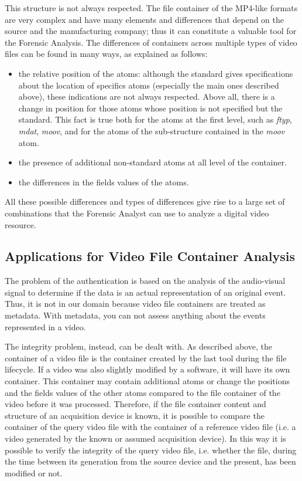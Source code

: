 This structure is not always respected. The file container of the MP4-like formats are very complex and have many elements and differences that depend on the source and the manufacturing company; thus it can constitute a valuable tool for the Forensic Analysis.
The differences of containers across multiple types of video files can be found in many ways, as explained as follows:
\begin{itemize}
\item the relative position of the atoms: although the standard gives specifications about the location of specifics atoms (especially the main ones described above), these indications are not always respected. Above all, there is a change in position for those atoms whose position is not specified but the standard. This fact is true both for the atoms at the first level, such as \emph{ftyp}, \emph{mdat}, \emph{moov}, and for the atoms of the sub-structure contained in the \emph{moov} atom.
\item the presence of additional non-standard atoms at all level of the container.
\item the differences in the fields values of the atoms.
\end{itemize}

All these possible differences and types of differences give rise to a large set of combinations that the Forensic Analyst can use to analyze a digital video resource.

\subsection{Applications for Video File Container Analysis}

The problem of the authentication is based on the analysis of the audio-visual signal to determine if the data is an actual representation of an original event. Thus, it is not in our domain because video file containers are treated as metadata. With metadata, you can not assess anything about the events represented in a video.

The integrity problem, instead, can be dealt with. As described above, the container of a video file is the container created by the last tool during the file lifecycle. If a video was also slightly modified by a software, it will have its own container. This container may contain additional atoms or change the positions and the fields values of the other atoms compared to the file container of the video before it was processed. Therefore, if the file container content and structure of an acquisition device is known, it is possible to compare the container of the query video file with the container of a reference video file (i.e. a video generated by the known or assumed acquisition device). In this way it is possible to verify the integrity of the query video file, i.e. whether the file, during the time between its generation from the source device and the present, has been modified or not.

